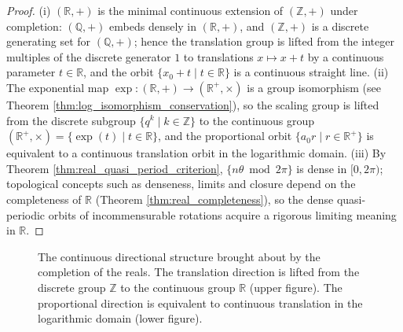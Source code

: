 \begin{proof}
(i) $(\mathbb{R},+)$ is the minimal continuous extension of $(\mathbb{Z},+)$ under completion: $(\mathbb{Q},+)$ embeds densely in $(\mathbb{R},+)$, and $(\mathbb{Z},+)$ is a discrete generating set for $(\mathbb{Q},+)$; hence the translation group is lifted from the integer multiples of the discrete generator $1$ to translations $x \mapsto x + t$ by a continuous parameter $t \in \mathbb{R}$, and the orbit $\{x_0 + t \mid t \in \mathbb{R}\}$ is a continuous straight line.
(ii) The exponential map $\exp: (\mathbb{R},+) \to (\mathbb{R}^+,\times)$ is a group isomorphism (see Theorem \ref{thm:log_isomorphism_conservation}), so the scaling group is lifted from the discrete subgroup $\{q^k \mid k \in \mathbb{Z}\}$ to the continuous group $(\mathbb{R}^+,\times) = \{\exp(t) \mid t \in \mathbb{R}\}$, and the proportional orbit $\{a_0 r \mid r \in \mathbb{R}^+\}$ is equivalent to a continuous translation orbit in the logarithmic domain.
(iii) By Theorem \ref{thm:real_quasi_period_criterion}, $\{n\theta \bmod 2\pi\}$ is dense in $[0,2\pi)$; topological concepts such as denseness, limits and closure depend on the completeness of $\mathbb{R}$ (Theorem \ref{thm:real_completeness}), so the dense quasi-periodic orbits of incommensurable rotations acquire a rigorous limiting meaning in $\mathbb{R}$.
\end{proof}

\begin{figure}[htbp]
\centering
{}
\caption{The continuous directional structure brought about by the completion of the reals. The translation direction is lifted from the discrete group $\mathbb{Z}$ to the continuous group $\mathbb{R}$ (upper figure). The proportional direction is equivalent to continuous translation in the logarithmic domain (lower figure).}
\label{fig:real_continuous}
\end{figure}
